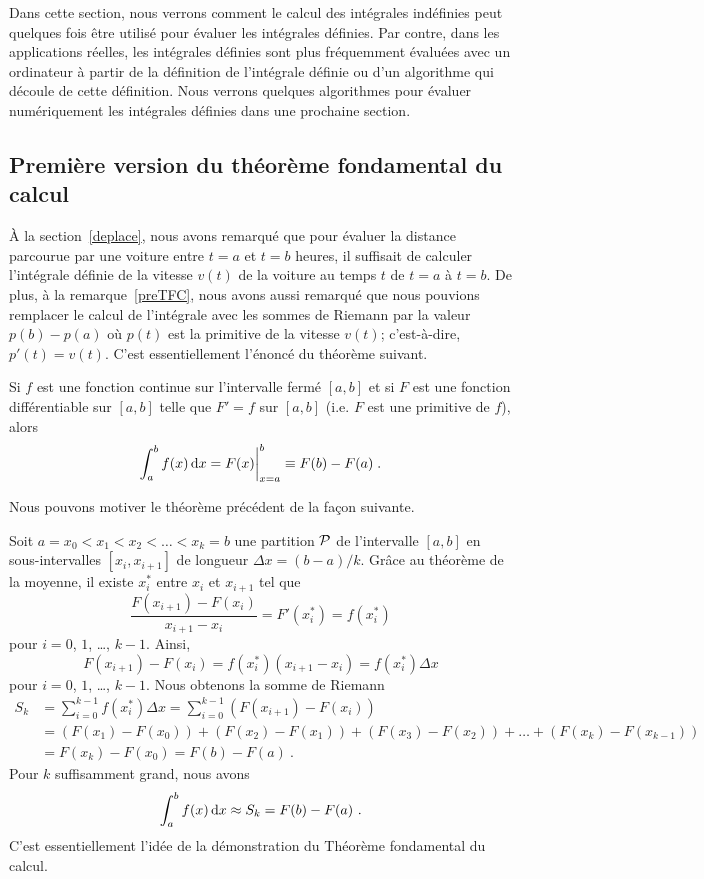 {Dans cette section, nous verrons comment le calcul des intégrales
indéfinies peut quelques fois être utilisé pour évaluer les intégrales
définies. Par contre, dans les applications réelles, les intégrales
définies sont plus fréquemment évaluées avec un ordinateur à partir de
la définition de l'intégrale définie ou d'un algorithme qui découle de
cette définition.  Nous verrons quelques algorithmes pour évaluer
numériquement les intégrales définies dans une prochaine section.

\subsection{Première version du théorème fondamental du calcul}

À la section~\ref{deplace}, nous avons remarqué que pour évaluer la
distance parcourue par une voiture entre $t=a$ et $t=b$ heures, il
suffisait de calculer l'intégrale définie de la vitesse $v(t)$ de la
voiture au temps $t$ de $t=a$ à $t=b$.  De plus, à la
remarque~\ref{preTFC}, nous avons aussi remarqué que nous pouvions
remplacer le calcul de l'intégrale avec les sommes de Riemann par la
valeur $p(b)-p(a)$ où $p(t)$ est la primitive de la vitesse $v(t)$;
c'est-à-dire, $p'(t) = v(t)$.  C'est essentiellement l'énoncé du
théorème suivant.

\begin{focus}{\thm}
Si $f$ est une fonction continue sur l'intervalle fermé $[a,b]$ et si
$F$ est une fonction différentiable sur $[a,b]$ telle que $F'=f$
sur $[a,b]$  (i.e. $F$ est une primitive de $f$), alors
\[
\int_a^b f(x)  \,\mathrm{d}x = F(x)\bigg|_{x=a}^{b} \equiv F(b) - F(a) \; .
\]
\end{focus}

\begin{rmk}
Nous pouvons motiver le théorème précédent de la façon suivante.

Soit $a=x_0 < x_1 < x_2 < \ldots < x_k = b$ une partition ${\cal P}$
de l'intervalle $[a,b]$ en sous-intervalles $[x_i, x_{i+1}]$ de
longueur $\Delta x = (b-a)/k$.  Grâce au théorème de la moyenne, il existe
$x_i^\ast$ entre $x_i$ et $x_{i+1}$ tel que
\[
\frac{F(x_{i+1})-F(x_i)}{x_{i+1}-x_i} = F'(x_i^\ast) = f(x_i^\ast)
\]
pour $i=0$, $1$, \ldots, $k-1$.  Ainsi,
\[
F(x_{i+1})-F(x_i) = f(x_i^\ast) (x_{i+1}-x_i) = f(x_i^\ast) \Delta x
\]
pour $i=0$, $1$, \ldots, $k-1$.  Nous obtenons la somme de Riemann
\begin{align*}
S_k &= \sum_{i=0}^{k-1} f(x_i^\ast) \Delta x
= \sum_{i=0}^{k-1} \left( F(x_{i+1})-F(x_i) \right) \\
&= \left( F(x_1)-F(x_0) \right) + \left( F(x_2)-F(x_1) \right)
+ \left( F(x_3)-F(x_2) \right) + \ldots + \left( F(x_k)-F(x_{k-1}) \right) \\
&= F(x_k) - F(x_0) = F(b) - F(a) \ .
\end{align*}
Pour $k$ suffisamment grand, nous avons
\[
\int_a^b f(x) \,\mathrm{d}x \approx S_k = F(b) - F(a) \ .
\]
C'est essentiellement l'idée de la démonstration du Théorème
fondamental du calcul.
\end{rmk}

}
